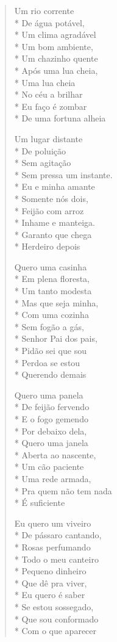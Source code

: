 \begin{verse}
Um rio corrente\\*
De água potável,\\*
Um clima agradável\\*
Um bom ambiente,\\*
Um chazinho quente\\*
Após uma lua cheia,\\*
Uma lua cheia\\*
No céu a brilhar\\*
Eu faço é zombar\\*
De uma fortuna alheia

Um lugar distante\\*
De poluição\\*
Sem agitação\\*
Sem pressa um instante.\\*
Eu e minha amante\\*
Somente nós dois,\\*
Feijão com arroz\\*
Inhame e manteiga.\\*
Garanto que chega\\*
Herdeiro depois

Quero uma casinha\\*
Em plena floresta,\\*
Um tanto modesta\\*
Mas que seja minha,\\*
Com uma cozinha\\*
Sem fogão a gás,\\*
Senhor Pai dos pais,\\*
Pidão sei que sou\\*
Perdoa se estou\\*
Querendo demais

Quero uma panela\\*
De feijão fervendo\\*
E o fogo gemendo\\*
Por debaixo dela,\\*
Quero uma janela\\*
Aberta ao nascente,\\*
Um cão paciente\\*
Uma rede armada,\\*
Pra quem não tem nada\\*
É suficiente

Eu quero um viveiro\\*
De pássaro cantando,\\*
Rosas perfumando\\*
Todo o meu canteiro\\*
Pequeno dinheiro\\*
Que dê pra viver,\\*
Eu quero é saber\\*
Se estou sossegado,\\*
Que sou conformado\\*
Com o que aparecer


\end{verse}
